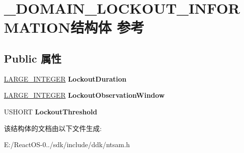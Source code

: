 \hypertarget{struct___d_o_m_a_i_n___l_o_c_k_o_u_t___i_n_f_o_r_m_a_t_i_o_n}{}\section{\+\_\+\+D\+O\+M\+A\+I\+N\+\_\+\+L\+O\+C\+K\+O\+U\+T\+\_\+\+I\+N\+F\+O\+R\+M\+A\+T\+I\+O\+N结构体 参考}
\label{struct___d_o_m_a_i_n___l_o_c_k_o_u_t___i_n_f_o_r_m_a_t_i_o_n}
\subsection*{Public 属性}
\begin{DoxyCompactItemize}
\item 
\mbox{\label{struct___d_o_m_a_i_n___l_o_c_k_o_u_t___i_n_f_o_r_m_a_t_i_o_n_afed6a11d9715fc77147eed40708e51e7}} 
\hyperlink{union___l_a_r_g_e___i_n_t_e_g_e_r}{L\+A\+R\+G\+E\+\_\+\+I\+N\+T\+E\+G\+ER} {\bfseries Lockout\+Duration}
\item 
\mbox{\label{struct___d_o_m_a_i_n___l_o_c_k_o_u_t___i_n_f_o_r_m_a_t_i_o_n_ad6900e9762f3e6c6b99cf2b6b0070706}} 
\hyperlink{union___l_a_r_g_e___i_n_t_e_g_e_r}{L\+A\+R\+G\+E\+\_\+\+I\+N\+T\+E\+G\+ER} {\bfseries Lockout\+Observation\+Window}
\item 
\mbox{\label{struct___d_o_m_a_i_n___l_o_c_k_o_u_t___i_n_f_o_r_m_a_t_i_o_n_a4293ab82e2759d122a2d46f14e92ef47}} 
U\+S\+H\+O\+RT {\bfseries Lockout\+Threshold}
\end{DoxyCompactItemize}


该结构体的文档由以下文件生成\+:\begin{DoxyCompactItemize}
\item 
E\+:/\+React\+O\+S-\/0../sdk/include/ddk/ntsam.\+h\end{DoxyCompactItemize}
